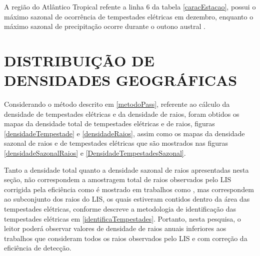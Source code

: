 A região do Atlântico Tropical refente a linha 6 da tabela \ref{caracEstacao}, possui o máximo sazonal de ocorrência de tempestades elétricas em dezembro, enquanto o máximo sazonal de precipitação ocorre durante o outono austral \cite{cusdodioTese}.



\section{DISTRIBUIÇÃO DE DENSIDADES GEOGRÁFICAS}
\label{secaoDensidades}

Considerando o método descrito em \ref{metodoPass}, referente ao cálculo da densidade de tempestades elétricas e da densidade de raios, foram obtidos os mapas da densidade total de tempestades elétricas e de raios, figuras \ref{densidadeTempestade} e \ref{densidadeRaios}, assim como os mapas da densidade sazonal de raios e de tempestades elétricas que são mostrados nas  figuras \ref{densidadeSazonalRaios} e \ref{DensidadeTempestadesSazonal}. 

Tanto a densidade total quanto a densidade sazonal de raios apresentadas nesta seção, não correspondem a amostragem total de raios observados pelo LIS corrigida pela eficiência como é mostrado em trabalhos como   , mas correspondem ao subconjunto dos raios do LIS, os quais estiveram contidos dentro da área das tempestades elétricas, conforme descreve a metodologia de identificação das tempestades elétricas em \ref{identificaTempestades}. Portanto, nesta pesquisa, o leitor poderá observar valores de densidade de raios anuais inferiores aos trabalhos que consideram todos os raios observados pelo LIS e com correção da eficiência de detecção.



